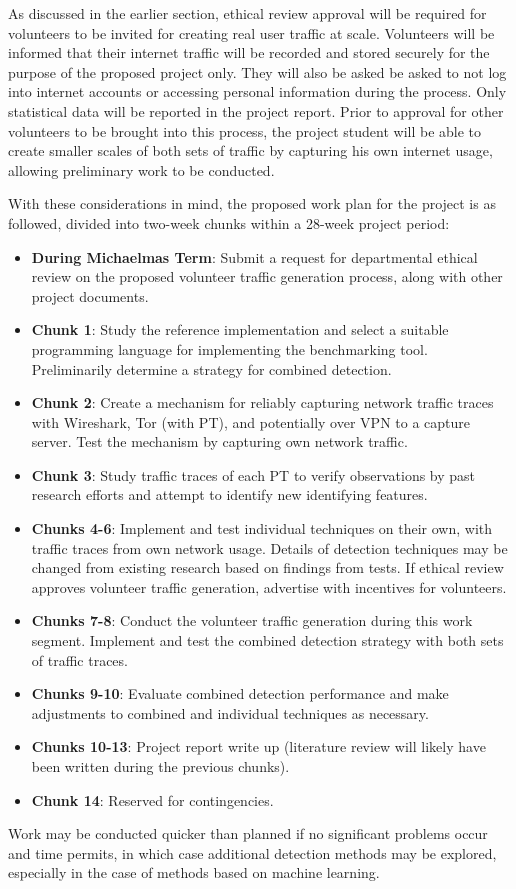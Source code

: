\documentclass[11pt]{article}
\begin{document}
As discussed in the earlier section, ethical review approval will be required for volunteers to be invited for creating real user traffic at scale. Volunteers will be informed that their internet traffic will be recorded and stored securely for the purpose of the proposed project only. They will also be asked be asked to not log into internet accounts or accessing personal information during the process. Only statistical data will be reported in the project report. Prior to approval for other volunteers to be brought into this process, the project student will be able to create smaller scales of both sets of traffic by capturing his own internet usage, allowing preliminary work to be conducted.

With these considerations in mind, the proposed work plan for the project is as followed, divided into two-week chunks within a 28-week project period:

\begin{itemize}
	\item \textbf{During Michaelmas Term}: Submit a request for departmental ethical review on the proposed volunteer traffic generation process, along with other project documents.
	\item \textbf{Chunk 1}: Study the reference implementation and select a suitable programming language for implementing the benchmarking tool. Preliminarily determine a strategy for combined detection.
	\item \textbf{Chunk 2}: Create a mechanism for reliably capturing network traffic traces with Wireshark, Tor (with PT), and potentially over VPN to a capture server. Test the mechanism by capturing own network traffic.
	\item \textbf{Chunk 3}: Study traffic traces of each PT to verify observations by past research efforts and attempt to identify new identifying features.
	\item \textbf{Chunks 4-6}: Implement and test individual techniques on their own, with traffic traces from own network usage. Details of detection techniques may be changed from existing research based on findings from tests.  If ethical review approves volunteer traffic generation, advertise with incentives for volunteers.
	\item \textbf{Chunks 7-8}: Conduct the volunteer traffic generation during this work segment. Implement and test the combined detection strategy with both sets of traffic traces. 
	\item \textbf{Chunks 9-10}: Evaluate combined detection performance and make adjustments to combined and individual techniques as necessary.
	\item \textbf{Chunks 10-13}: Project report write up (literature review will likely have been written during the previous chunks).
	\item \textbf{Chunk 14}: Reserved for contingencies.
\end{itemize}

Work may be conducted quicker than planned if no significant problems occur and time permits, in which case additional detection methods may be explored, especially in the case of methods based on machine learning.


\footnotesize{}
\end{document}
